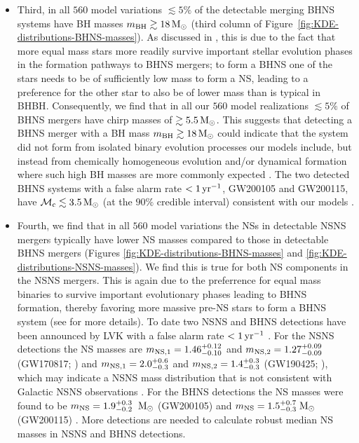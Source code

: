 \documentclass[fleqn,usenatbib]{mnras}
\newcommand{\Msun}{\ensuremath{\,\rm{M}_{\odot}}\xspace}
\newcommand{\yearmin}{\ensuremath{\,\rm{yr}^{-1}}\xspace}
\newcommand{\mnsf}{\ensuremath{m_{\rm{NS}}}\xspace}
\newcommand{\mnsfone}{\ensuremath{m_{\rm{NS,1}}}\xspace}
\newcommand{\mnsftwo}{\ensuremath{m_{\rm{NS,2}}}\xspace}
\newcommand{\mbhf}{\ensuremath{m_{\rm{BH}}}\xspace}
\newcommand{\mchirpf}{\ensuremath{{\mathcal{M}}_{\rm{c}}}\xspace}
\newcommand{\Nmodels}{\ensuremath{560}\xspace}
\begin{document}
\begin{itemize}
\item Third, in all \Nmodels model variations $\lesssim 5\%$ of the detectable merging \ac{BHNS} systems have \ac{BH} masses $\mbhf\gtrsim 18\Msun$ (third column of Figure~\ref{fig:KDE-distributions-BHNS-masses}). As discussed in  , this is due to the fact that more equal mass stars more readily survive important stellar evolution phases in the formation pathways to \ac{BHNS} mergers; to form a \ac{BHNS} one of the stars needs to be of sufficiently low mass to form a \ac{NS}, leading to a preference for the other star to also be of lower mass than is typical in \ac{BHBH}.  Consequently, we find that in all our \Nmodels model realizations $\lesssim 5\%$ of \ac{BHNS} mergers have chirp masses of $\gtrsim 5.5 \Msun$.  This suggests that detecting a \ac{BHNS} merger with a \ac{BH} mass  $\mbhf\gtrsim 18\Msun$ could indicate that the system did not form from isolated binary evolution processes our models include, but instead from chemically homogeneous evolution and/or dynamical formation where such high \ac{BH} masses are more commonly expected \citep[e.g.,][]{2017A&A...604A..55M,2020MNRAS.498.4088M,2020MNRAS.497.1563R}.  The two detected \ac{BHNS} systems with a false alarm rate $< 1\yearmin$, GW200105 and GW200115, have $\mchirpf\lesssim 3.5 \Msun$ (at the $90\%$ credible interval) \citep[][]{Abbott:2021-first-NSBH} consistent with our models \citep[see also][]{BroekgaardenBerger2021,Broekgaarden:2021}. 

\item Fourth, we find that in all \Nmodels model variations the \acp{NS} in detectable \ac{NSNS} mergers typically have lower \ac{NS} masses compared to those in detectable \ac{BHNS} mergers  (Figures \ref{fig:KDE-distributions-BHNS-masses} and \ref{fig:KDE-distributions-NSNS-masses}). We find this is true for both NS components in the \ac{NSNS} mergers. This is again due to the preferrence for equal mass binaries to survive important evolutionary phases leading to \ac{BHNS} formation, thereby favoring more massive pre-\ac{NS} stars to form a \ac{BHNS} system (see   for more details). To date two  \ac{NSNS} and \ac{BHNS} detections have been announced by LVK with a false alarm rate $ < 1 \yearmin$ \citep{Abbott:2021GWTC3pop}. For the \ac{NSNS} detections the \ac{NS} masses are $\mnsfone=1.46_{-0.10}^{+0.12}$ and $\mnsftwo = {1.27}_{-0.09}^{+0.09}$  (GW170817; \citealt{Abbott:17gw170817discovery}) and $\mnsfone=2.0_{-0.3}^{+0.6}$ and $\mnsftwo = {1.4}_{-0.3}^{+0.3}$ (GW190425; \citealt{Abbott:2020gw190425}), which may indicate a \ac{NSNS} mass distribution that is not consistent with Galactic \ac{NSNS} observations \citep[e.g.][]{VignaGomez:2018, Abbott:2021GWTC3pop}. For the \ac{BHNS} detections the \ac{NS} masses were found to be $\mnsf = 1.{9}_{-0.2}^{+0.3}$ $\Msun$ (GW200105) and $\mnsf = 1.{5}_{-0.3}^{+0.7}$\Msun (GW200115) \citep{Abbott:2021-first-NSBH}. More detections are needed to calculate robust median \ac{NS} masses in \ac{NSNS} and \ac{BHNS} detections. 
%
\end{itemize}
\end{document}
